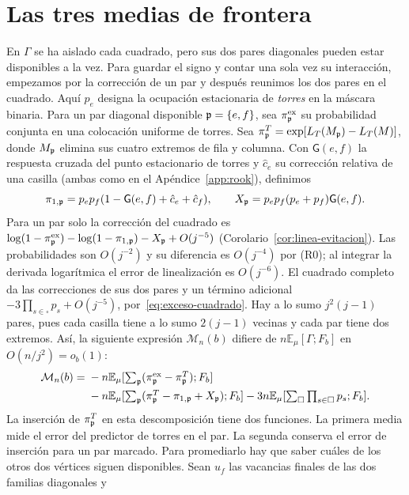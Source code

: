 \section{Las tres medias de frontera}\label{app:boundary}
En \(\Gamma\) se ha aislado cada cuadrado, pero sus dos pares diagonales pueden estar disponibles
a la vez. Para guardar el signo y contar una sola vez su interacción, empezamos por la
corrección de un par y después reunimos los dos pares en el cuadrado. Aquí \(p_e\) designa
la ocupación estacionaria de \emph{torres} en la máscara binaria.
Para un par diagonal disponible \(\mathfrak p=\{e,f\}\), sea \(\pi^{\rm ex}_{\mathfrak p}\) su probabilidad
 conjunta en
una colocación uniforme de torres. Sea \(\pi^T_{\mathfrak p}=\exp[L_T(M_{\mathfrak p})-L_T(M)]\), donde
 \(M_{\mathfrak p}\) elimina sus
cuatro extremos de fila y columna. Con \(\mathsf G(e,f)\) la respuesta cruzada del punto estacionario
de torres y \(\hat c_e\) su corrección relativa de una casilla (ambas como en el
Apéndice~\ref{app:rook}), definimos
\[
 \pi_{1,\mathfrak p}=p_ep_f(1-\mathsf G(e,f)+\hat c_e+\hat c_f),\qquad
 X_{\mathfrak p}=p_ep_f(p_e+p_f)\mathsf G(e,f).
\]
Para un par solo la corrección del cuadrado es
\(\log(1-\pi^{\rm ex}_{\mathfrak p})-\log(1-\pi_{1,\mathfrak p})-X_{\mathfrak p}+O(j^{-5})\)
(Corolario~\ref{cor:linea-evitacion}).
Las probabilidades son \(O(j^{-2})\) y su diferencia es \(O(j^{-4})\) por (R0); al integrar la derivada
logarítmica el error de linealización es \(O(j^{-6})\). El cuadrado completo da las correcciones
de sus dos pares y un término adicional \(-3\prod_{s\in\square}p_s+O(j^{-5})\),
por~\eqref{eq:exceso-cuadrado}.
Hay a lo sumo \(j^2(j-1)\) pares, pues cada casilla tiene a lo sumo \(2(j-1)\) vecinas y cada
par tiene dos extremos. Así, la siguiente expresión \(\mathcal M_n(b)\) difiere de \(n\mathbb
 E_\mu[\Gamma;F_b]\)
en \(O(n/j^2)=o_b(1)\):
\begin{align*}
 \mathcal M_n(b)={}&-n\mathbb E_\mu[\textstyle\sum_{\mathfrak p}(\pi^{\rm ex}_{\mathfrak p}-\pi^T_{\mathfrak p});F_b]\\
           &-n\mathbb E_\mu[\textstyle\sum_{\mathfrak p}(\pi^T_{\mathfrak p}-\pi_{1,\mathfrak p}+X_{\mathfrak p});F_b]
            -3n\mathbb E_\mu[\textstyle\sum_\square\prod_{s\in\square}p_s;F_b].
\end{align*}
La inserción de \(\pi^T_{\mathfrak p}\) en esta descomposición tiene dos funciones. La primera media mide
el error del predictor de torres en el par. La segunda conserva el error de inserción
para un par marcado. Para promediarlo hay que saber cuáles de los otros dos vértices siguen
disponibles. Sean \(u_f\) las vacancias finales de las dos familias diagonales y
